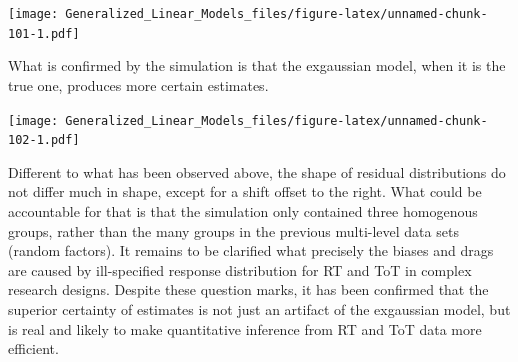 \documentclass[]{svmono}
\newenvironment{Shaded}{\begin{snugshade}}{\end{snugshade}}
\newcommand{\KeywordTok}[1]{\textcolor[rgb]{0.13,0.29,0.53}{\textbf{#1}}}
\newcommand{\DataTypeTok}[1]{\textcolor[rgb]{0.13,0.29,0.53}{#1}}
\newcommand{\DecValTok}[1]{\textcolor[rgb]{0.00,0.00,0.81}{#1}}
\newcommand{\StringTok}[1]{\textcolor[rgb]{0.31,0.60,0.02}{#1}}
\newcommand{\OperatorTok}[1]{\textcolor[rgb]{0.81,0.36,0.00}{\textbf{#1}}}
\newcommand{\NormalTok}[1]{#1}
\theoremstyle{definition}
\theoremstyle{definition}
\theoremstyle{definition}
\theoremstyle{remark}
\begin{document}
\begin{Shaded}
\end{Shaded}

\texttt{[image: Generalized\_Linear\_Models\_files/figure-latex/unnamed-chunk-101-1.pdf]}

What is confirmed by the simulation is that the exgaussian model, when
it is the true one, produces more certain estimates.

\begin{Shaded}
\end{Shaded}

\texttt{[image: Generalized\_Linear\_Models\_files/figure-latex/unnamed-chunk-102-1.pdf]}

Different to what has been observed above, the shape of residual
distributions do not differ much in shape, except for a shift offset to
the right. What could be accountable for that is that the simulation
only contained three homogenous groups, rather than the many groups in
the previous multi-level data sets (random factors). It remains to be
clarified what precisely the biases and drags are caused by
ill-specified response distribution for RT and ToT in complex research
designs. Despite these question marks, it has been confirmed that the
superior certainty of estimates is not just an artifact of the
exgaussian model, but is real and likely to make quantitative inference
from RT and ToT data more efficient.
\end{document}
